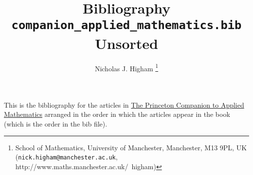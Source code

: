 \documentclass[12pt]{article}
\title{Bibliography \texttt{companion\_applied\_mathematics.bib} Unsorted}
\author{Nicholas J. Higham%
        \thanks{%
                School of Mathematics,
                University of Manchester,
                Manchester, M13 9PL, UK 
                (\texttt{nick.higham@manchester.ac.uk},
                http://www.maths.manchester.ac.uk/\string~higham)
               }
}
\begin{document}
\maketitle

This is the bibliography for the articles in 
\href{http://www.ma.man.ac.uk/~higham/pcam/index.php}{The Princeton
  Companion to Applied Mathematics} \cite{higham15PCAM}
arranged in the order in which the articles appear in the book
(which is the order in the bib file).

\nocite{*}



\end{document}
